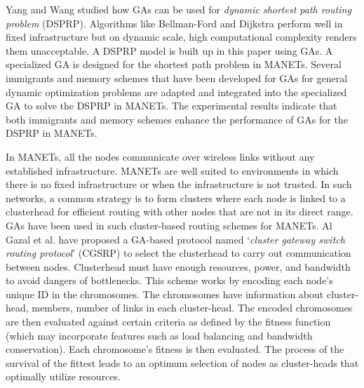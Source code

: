 \documentclass[journal]{IEEEtran}
\begin{document}
Yang and Wang \cite{yang2010genetic} studied how GAs can be used for \textit{dynamic shortest path routing problem} (DSPRP). Algorithms like Bellman-Ford and Dijkstra perform well in fixed infrastructure but on dynamic scale, high computational complexity renders them unacceptable. A DSPRP model is built up in this paper using GAs. A specialized GA is designed for the shortest path problem in MANETs. Several immigrants and memory schemes that have been developed for GAs for general dynamic optimization problems are adapted and integrated into the specialized GA to solve the DSPRP in MANETs. The experimental results indicate that both immigrants and memory schemes enhance the performance of GAs for the DSPRP in MANETs.

In MANETs, all the nodes communicate over wireless links without any established infrastructure. MANETs are well suited to environments in which there is no fixed infrastructure or when the infrastructure is not trusted. In such networks, a common strategy is to form clusters where each node is linked to a clusterhead for efficient routing with other nodes that are not in its direct range. GAs have been used in such cluster-based routing schemes for MANETs. Al Gazal et al. \cite{al2007routing} have proposed a GA-based protocol named `\textit{cluster gateway switch routing protocol}' (CGSRP) to select the clusterhead to carry out communication between nodes. Clusterhead must have enough resources, power, and bandwidth to avoid dangers of bottlenecks. This scheme works by encoding each node's unique ID in the chromosomes. The chromosomes have information about cluster-head, members, number of links in each cluster-head. The encoded chromosomes are then evaluated against certain criteria as defined by the fitness function (which may incorporate features such as load balancing and bandwidth conservation). Each chromosome's fitness is then evaluated. The process of the survival of the fittest leads to an optimum selection of nodes as cluster-heads that optimally utilize resources. 
\end{document}

